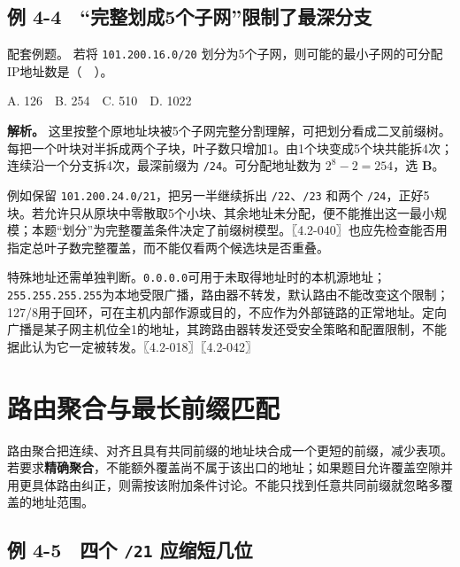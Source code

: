 \subsection{例 4-4　``完整划成5个子网''限制了最深分支}\label{CN04-ex4}

\begin{example}[配套例题]

配套例题。 若将 \texttt{101.\allowbreak{}200.\allowbreak{}16.\allowbreak{}0/\allowbreak{}20} 划分为5个子网，则可能的最小子网的可分配IP地址数是（　）。

A. 126　B. 254　C. 510　D. 1022

\end{example}

\textbf{解析。} 这里按整个原地址块被5个子网完整分割理解，可把划分看成二叉前缀树。每把一个叶块对半拆成两个子块，叶子数只增加1。由1个块变成5个块共能拆4次；连续沿一个分支拆4次，最深前缀为 \texttt{/\allowbreak{}24}。可分配地址数为 \(2^8-2=254\)，选 \textbf{B}。

例如保留 \texttt{101.\allowbreak{}200.\allowbreak{}24.\allowbreak{}0/\allowbreak{}21}，把另一半继续拆出 \texttt{/\allowbreak{}22}、\texttt{/\allowbreak{}23} 和两个 \texttt{/\allowbreak{}24}，正好5块。若允许只从原块中零散取5个小块、其余地址未分配，便不能推出这一最小规模；本题``划分''为完整覆盖条件决定了前缀树模型。〖4.2-040〗也应先检查能否用指定总叶子数完整覆盖，而不能仅看两个候选块是否重叠。

特殊地址还需单独判断。\texttt{0.\allowbreak{}0.\allowbreak{}0.\allowbreak{}0}可用于未取得地址时的本机源地址；\texttt{255.\allowbreak{}255.\allowbreak{}255.\allowbreak{}255}为本地受限广播，路由器不转发，默认路由不能改变这个限制；127/8用于回环，可在主机内部作源或目的，不应作为外部链路的正常地址。定向广播是某子网主机位全1的地址，其跨路由器转发还受安全策略和配置限制，不能据此认为它一定被转发。〖4.2-018〗〖4.2-042〗

\section{路由聚合与最长前缀匹配}\label{CN04-09}

路由聚合把连续、对齐且具有共同前缀的地址块合成一个更短的前缀，减少表项。若要求\textbf{精确聚合}，不能额外覆盖尚不属于该出口的地址；如果题目允许覆盖空隙并用更具体路由纠正，则需按该附加条件讨论。不能只找到任意共同前缀就忽略多覆盖的地址范围。

\subsection{\texorpdfstring{例 4-5　四个 \texttt{/\allowbreak{}21} 应缩短几位}{例 4-5　四个  应缩短几位}}\label{CN04-ex5}

